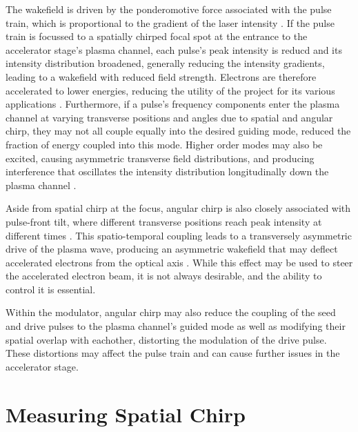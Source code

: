 The wakefield is driven by the ponderomotive force associated with the pulse train, which
is proportional to the gradient of the laser
intensity \cite{esarey2009,jakobsson2021}.
If the pulse train is focussed to a spatially chirped focal spot at the entrance to the accelerator
stage's plasma channel, each pulse's peak intensity is reducd and its intensity distribution broadened,
generally reducing the intensity gradients,
leading to a wakefield with reduced field strength.
 Electrons are therefore accelerated to lower energies, reducing the utility of the 
project for its various applications \cite{vandewetering2024}. Furthermore, if a pulse's frequency
components enter the plasma channel
at varying transverse positions and angles due to spatial and angular chirp, they may not all couple
equally into the desired guiding mode, reduced the fraction of energy coupled into this mode. 
Higher order modes 
may also be excited, causing asymmetric transverse field distributions, and producing interference that
oscillates the intensity distribution longitudinally down the plasma channel \cite{vandewetering2024,wang2017}.

Aside from spatial chirp at the focus, angular chirp is also closely associated with pulse-front tilt,
where different transverse positions reach peak intensity at different times \cite{akturk2004}. This spatio-temporal 
coupling leads to a transversely asymmetric drive of the plasma wave, producing an asymmetric wakefield
that may deflect accelerated electrons from the optical axis \cite{thevenet2019}. While this effect may be used to 
steer the accelerated electron beam, it is not always desirable, and the ability to control it is
essential.

Within the modulator, angular chirp may also reduce the coupling of the seed and drive pulses to the
plasma channel's guided mode as well as modifying their spatial overlap with eachother, distorting 
the modulation of the drive pulse. These distortions may affect the pulse train and can
cause further issues in the accelerator stage.



\section{Measuring Spatial Chirp}
\label{sec:intro-measuring}

